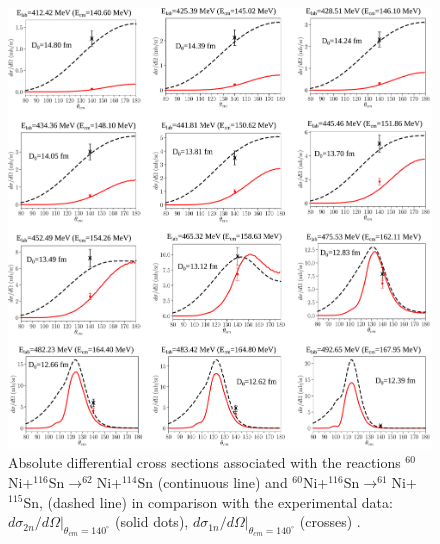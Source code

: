     \begin{figure}
	\centerline{\includegraphics*[width=16cm,angle=0]{C8/figsC8/SnNi2n_v4}}
	\caption{ Absolute differential cross sections associated with the reactions $^{60}$Ni+$^{116}$Sn$\to^{62}$Ni+$^{114}$Sn (continuous line) and $^{60}$Ni+$^{116}$Sn$\to^{61}$Ni+$^{115}$Sn, (dashed line) in comparison with the experimental  data: $d\sigma_{2n} /d\Omega|_{\theta_{cm}=140^\circ}$ (solid dots), $d\sigma_{1n} /d\Omega|_{\theta_{cm}=140^\circ}$ (crosses) \citep{Montanari:14}.
	}\label{fig7.3.1}
\end{figure}



